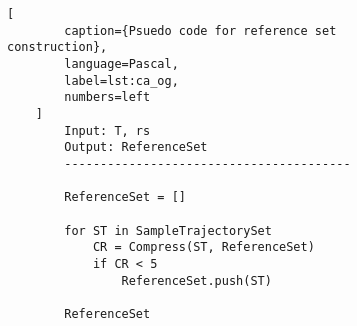 \begin{figure}[t]
    \begin{lstlisting}[
        caption={Psuedo code for reference set construction},
        language=Pascal,
        label=lst:ca_og,
        numbers=left
    ]
        Input: T, rs
        Output: ReferenceSet
        ----------------------------------------

        ReferenceSet = []

        for ST in SampleTrajectorySet
            CR = Compress(ST, ReferenceSet)
            if CR < 5 
                ReferenceSet.push(ST)

        ReferenceSet
    \end{lstlisting}
\end{figure}